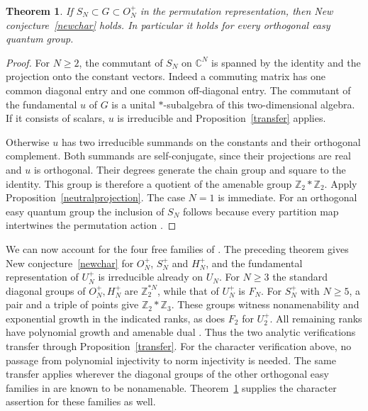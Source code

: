 \documentclass[11pt,a4paper]{article}
\newtheorem{thm}{Theorem}[section]
\theoremstyle{remark}
\begin{document}
\begin{thm}\label{easycharacters}
If $S_N\subset G\subset O_N^+$ in the permutation representation,
then New conjecture~\ref{newchar} holds. In particular it holds for every
orthogonal easy quantum group.
\end{thm}
\begin{proof}
For $N\ge2$, the commutant of $S_N$ on $\mathbb C^N$ is spanned by the
identity and the projection onto the constant vectors. Indeed a commuting
matrix has one common diagonal entry and one common off-diagonal entry.
The commutant of the fundamental $u$ of $G$ is a unital $*$-subalgebra
of this two-dimensional algebra. If it consists of scalars, $u$ is
irreducible and Proposition~\ref{transfer} applies.

Otherwise $u$ has two irreducible summands on the constants and their
orthogonal complement. Both summands are self-conjugate, since their
projections are real and $u$ is orthogonal. Their degrees generate the
chain group and square to the identity. This group is therefore a
quotient of the amenable group $\mathbb Z_2*\mathbb Z_2$. Apply
Proposition~\ref{neutralprojection}. The case $N=1$ is immediate.
For an orthogonal easy quantum group the inclusion of $S_N$ follows
because every partition map intertwines the permutation action
\cite{liberation}.
\end{proof}

We can now account for the four free families of \cite[Theorem~4.4]{bp}.
The preceding theorem gives New conjecture~\ref{newchar} for $O_N^+$,
$S_N^+$ and $H_N^+$, and the fundamental representation of $U_N^+$
is irreducible already on $U_N$. For $N\ge3$ the standard diagonal
groups of $O_N^+,H_N^+$ are $\mathbb Z_2^{*N}$, while that of $U_N^+$
is $F_N$. For $S_N^+$ with $N\ge5$, a pair and a triple of points
give $\mathbb Z_2*\mathbb Z_3$. These groups witness nonamenability
and exponential growth in the indicated ranks, as does $F_2$ for
$U_2^+$. All remaining ranks have polynomial growth and amenable dual
\cite[Theorem~4.4]{bp}. Thus the two analytic verifications transfer
through Proposition~\ref{transfer}. For the character verification
above, no passage from polynomial injectivity to norm injectivity is
needed. The same transfer applies wherever the diagonal groups of the
other orthogonal easy families in \cite[Section~6]{bp} are known to be
nonamenable. Theorem~\ref{easycharacters} supplies the character
assertion for these families as well.
\end{document}
